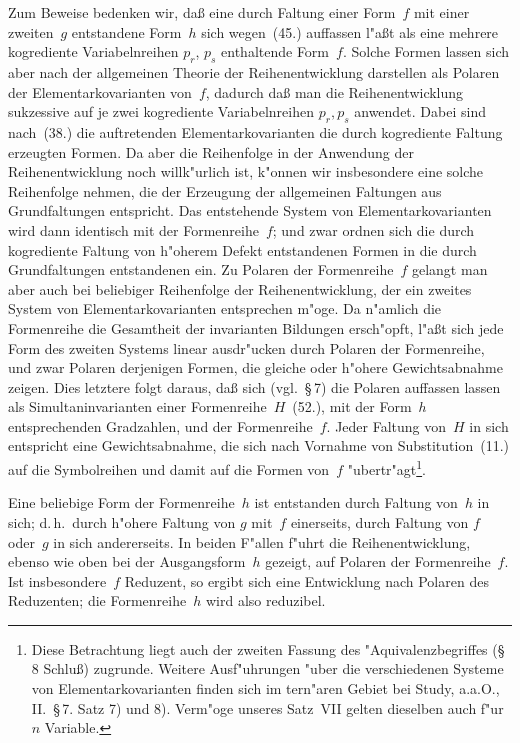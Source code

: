 \documentclass[11pt,a4paper]{article}
\begin{document}
\smallskip
\noindent
Zum Beweise bedenken wir, da\ss{} eine durch Faltung einer Form~$f$
mit einer zweiten~$g$ entstandene Form~$h$ sich wegen~(45.) auffassen
l"{a}\ss{}t als eine mehrere kogrediente Variabelnreihen $p_{r}$, $p_{s}$ enthaltende
Form~$f$. Solche Formen lassen sich aber nach der allgemeinen Theorie
der Reihenentwicklung darstellen als Polaren der Elementarkovarianten
von~$f$, dadurch da\ss{} man die Reihenentwicklung sukzessive auf je zwei
kogrediente Variabelnreihen $p_{r},p_{s}$ anwendet. Dabei sind nach~(38.) die
auftretenden Elementarkovarianten die durch kogrediente Faltung erzeugten
Formen. Da aber die Reihenfolge in der Anwendung der Reihenentwicklung
noch willk"{u}rlich ist, k"{o}nnen wir insbesondere eine solche Reihenfolge nehmen,
die der Erzeugung der allgemeinen Faltungen aus Grundfaltungen entspricht.
Das entstehende System von Elementarkovarianten wird dann identisch mit
der Formenreihe~$f$; und zwar ordnen sich die durch kogrediente Faltung von
h"{o}herem Defekt entstandenen Formen in die durch Grundfaltungen entstandenen
ein. Zu Polaren der Formenreihe~$f$ gelangt man aber auch bei beliebiger
Reihenfolge der Reihenentwicklung, der ein zweites System von
Elementarkovarianten entsprechen m"{o}ge. Da n"{a}mlich die Formenreihe die
Gesamtheit der invarianten Bildungen ersch"{o}pft, l"{a}\ss{}t sich jede Form des
zweiten Systems linear ausdr"{u}cken durch Polaren der Formenreihe, und
zwar Polaren derjenigen Formen, die gleiche oder h"{o}here Gewichtsabnahme
zeigen. Dies letztere folgt daraus, da\ss{} sich (vgl.\ \S\,7) die Polaren
auffassen lassen als Simultaninvarianten einer Formenreihe~$H$~(52.), mit
der Form~$h$ entsprechenden Gradzahlen, und der Formenreihe~$f$. Jeder
Faltung von~$H$ in sich entspricht eine Gewichtsabnahme, die sich nach
Vornahme von Substitution~(11.) auf die Symbolreihen und damit auf die
Formen von~$f$ "{u}bertr"{a}gt\footnote{Diese Betrachtung liegt auch der zweiten
Fassung des "{A}quivalenzbegriffes (\S\,8 Schlu\ss) zugrunde. Weitere Ausf"{u}hrungen
"{u}ber die verschiedenen Systeme von Elementarkovarianten finden sich im
tern"{a}ren Gebiet bei Study, a.a.O., II.\ \S\,7. Satz 7) und 8). Verm"{o}ge unseres
Satz~VII gelten dieselben auch f"{u}r $n$ Variable.}.

Eine beliebige Form der Formenreihe~$h$ ist entstanden durch Faltung
von~$h$ in sich; d.\,h.\ durch h"{o}here Faltung von $g$ mit~$f$ einerseits,
durch Faltung von $f$ oder~$g$ in sich andererseits. In beiden F"{a}llen f"{u}hrt
die Reihenentwicklung, ebenso wie oben bei der Ausgangsform~$h$ gezeigt,
auf Polaren der Formenreihe~$f$. Ist insbesondere~$f$ Reduzent, so ergibt
sich eine Entwicklung nach Polaren des Reduzenten; die Formenreihe~$h$
wird also reduzibel.
\end{document}
